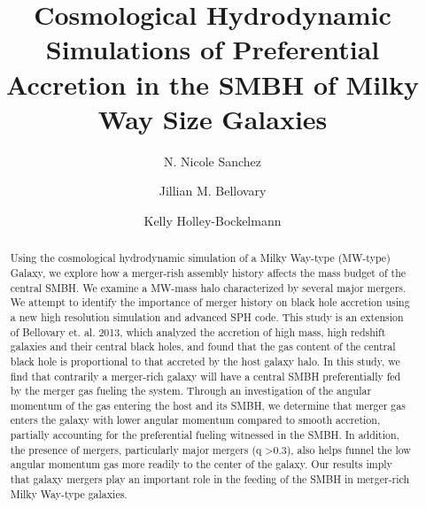 \documentclass[manuscript]{aastex}
\begin{document}
 

\title{Cosmological Hydrodynamic Simulations of Preferential Accretion in the SMBH of Milky Way Size Galaxies}



\author{N. Nicole Sanchez }
\author{Jillian M. Bellovary}
\author{Kelly Holley-Bockelmann}



\begin{abstract}\label{abs:abstractlabel}

Using the cosmological hydrodynamic simulation of a Milky Way-type (MW-type) Galaxy, we explore how a merger-rish assembly history affects the mass budget of the central SMBH. We examine a MW-mass halo characterized by several major mergers. We attempt to identify the importance of merger history on black hole accretion using a new high resolution simulation and advanced SPH code. This study is an extension of Bellovary et. al. 2013, which analyzed the accretion of high mass, high redshift galaxies and their central black holes, and found that the gas content of the central black hole is proportional to that accreted by the host galaxy halo. In this study, we find that contrarily a merger-rich galaxy will have a central SMBH preferentially fed by the merger gas fueling the system. Through an investigation of the angular momentum of the gas entering the host and its SMBH, we determine that merger gas enters the galaxy with lower angular momentum compared to smooth accretion, partially accounting for the preferential fueling witnessed in the SMBH. In addition, the presence of mergers, particularly major mergers (q \textgreater 0.3), also helps funnel the low angular momentum gas more readily to the center of the galaxy. Our results imply that galaxy mergers play an important role in the feeding of the SMBH in merger-rich Milky Way-type galaxies.

\end{abstract}
\end{document}
